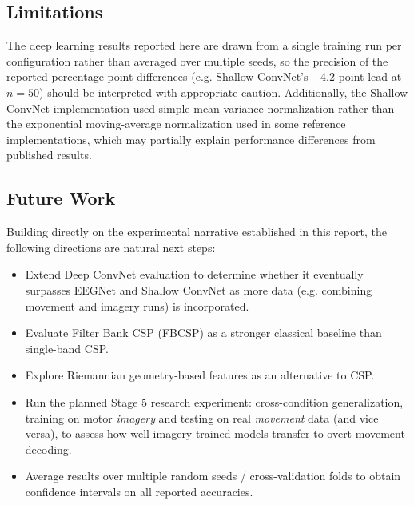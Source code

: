 \documentclass[11pt,a4paper]{article}
\begin{document}
\subsection{Limitations}
The deep learning results reported here are drawn from a single training run per configuration rather than averaged over multiple seeds, so the precision of the reported percentage-point differences (e.g. Shallow ConvNet's +4.2 point lead at $n=50$) should be interpreted with appropriate caution. Additionally, the Shallow ConvNet implementation used simple mean-variance normalization rather than the exponential moving-average normalization used in some reference implementations, which may partially explain performance differences from published results.

\subsection{Future Work}
Building directly on the experimental narrative established in this report, the following directions are natural next steps:
\begin{itemize}[leftmargin=1.5em]
    \item Extend Deep ConvNet evaluation to determine whether it eventually surpasses EEGNet and Shallow ConvNet as more data (e.g. combining movement and imagery runs) is incorporated.
    \item Evaluate Filter Bank CSP (FBCSP) as a stronger classical baseline than single-band CSP.
    \item Explore Riemannian geometry-based features as an alternative to CSP.
    \item Run the planned Stage 5 research experiment: cross-condition generalization, training on motor \emph{imagery} and testing on real \emph{movement} data (and vice versa), to assess how well imagery-trained models transfer to overt movement decoding.
    \item Average results over multiple random seeds / cross-validation folds to obtain confidence intervals on all reported accuracies.
\end{itemize}

\newpage
\end{document}
